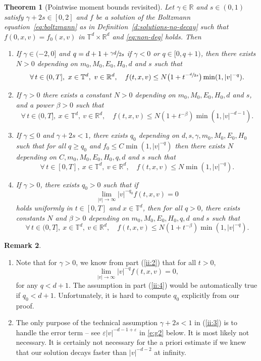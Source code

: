 \documentclass[11pt]{article}
\newcommand{\skpt}{\smallskip}
\theoremstyle{plain}
\newtheorem{thm}{Theorem}[section]
\theoremstyle{definition}
\newtheorem{remark}[thm]{Remark}
\numberwithin{equation}{section}
\newcommand{\R}{\mathbb R}
\newcommand{\eps}{\varepsilon}
\let\A N
\begin{document}
\begin{thm}[Pointwise moment bounds revisited]\label{thm:upper2}
Let $\gamma \in \R$ and $s \in (0,1)$ satisfy $\gamma +2s \in [0,2]$
and $f$ be a solution of the Boltzmann equation~\eqref{eq:boltzmann}
as in Definition~\ref{d:solutions-no-decay} such that
$f(0,x,v)=f_0(x,v)$ in $\mathbb{T}^d \times \R^d$ and \eqref{eq:non-deg}
holds. Then
\begin{enumerate}
\item \label{ii:1} If $\gamma \in (-2,0]$ and
$q = d+1+\sfrac{\gamma d}{2s}$ if $\gamma <0$ or $q \in [0,q+1)$,
then there exists $\A>0$ depending on $m_0,M_0,E_0, H_0, d$ and $s$
such that
\[
\forall \, t \in (0,T], \ x \in \mathbb{T}^d, \ v \in \R^d, \quad
f(t,x,v) \le \A \bigl(1+t^{-\sfrac{d}{2s}} \bigr) \min
(1,|v|^{-q}).
\]
\item \label{ii:2} If $\gamma >0$ there exists a constant $\A>0$
depending on $m_0,M_0,E_0,H_0,d$ and $s$, and a power $\beta>0$ such
that
\[ \forall \, t \in (0,T], \ x \in \mathbb{T}^d, \ v \in \R^d, \quad
f(t,x,v) \le \A \left(1+t^{-\beta} \right) \min(1,|v|^{-d-1}
).\]
\item \label{ii:3} If $\gamma \leq 0$ and $\gamma+2s < 1$, there
exists $q_0$ depending on $d,s,\gamma, m_0,M_0,E_0,H_0$ such that for
all $q \ge q_0$ and $f_0 \le C \min (1 , |v|^{-q})$ then there
exists $\A$ depending on $C,m_0,M_0,E_0,H_0,q, d$ and $s$ such that
\[
\forall \, t \in [0,T], \ x \in \mathbb{T}^d, \ v \in \R^d, \quad
f (t,x,v) \le \A \min(1, |v|^{-q}).
\]
\item \label{ii:4} If $\gamma > 0$, there exists $q_0 >0$ such that if
\[ \lim_{|v| \to \infty} |v|^{-q_0} f(t,x,v) = 0\] holds
uniformly in $t \in [0,T]$ and $x \in \mathbb{T}^d$, then for all
$q>0$, there exists constants $\A$ and $\beta>0$ depending on
$m_0,M_0,E_0,H_0,q,d$ and $s$ such that
\[
\forall \, t \in (0,T], \ x \in \mathbb{T}^d, \ v \in \R^d,
\quad f(t,x,v) \le \A \left(1+t^{-\beta} \right) \min
(1,|v|^{-q}).
\]
\end{enumerate}
\end{thm}

\skpt
\begin{remark}
\begin{enumerate}
\item Note that for $\gamma >0$, we know from part (\ref{ii:2})
that for all $t>0$,
\[ \lim_{|v| \to \infty} |v|^{-q} f(t,x,v) = 0, \]
for any $q <
d+1$. The assumption in part (\ref{ii:4}) would be automatically
true if $q_0 < d+1$. Unfortunately, it is hard to compute $q_0$
explicitly from our proof.
\item \label{rem:gammaplus2s}
The only purpose of the technical assumption $\gamma+2s<1$ in
(\ref{ii:3}) is to handle the error term -- see
$\eps |v|^{-d-1+\eps}$ in \eqref{e:g2} below. It is most likely not
necessary. It is certainly not necessary for the a priori estimate
if we knew that our solution decays faster than $|v|^{-d-2}$ at
infinity.
\end{enumerate}
\end{remark}
\end{document}
